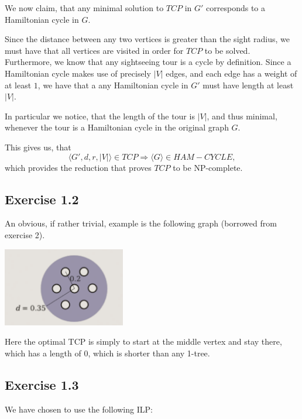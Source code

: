 \documentclass[11pt,a4paper]{article}
\begin{document}
We now claim, that any minimal solution to $TCP$ in $G'$ corresponds to
a Hamiltonian cycle in $G$.

Since the distance between any two vertices is greater than the sight radius,
we must have that all vertices are visited in order for $TCP$ to be solved.
Furthermore, we know that any sightseeing tour is a cycle by definition. Since a
Hamiltonian cycle makes use of precisely $|V|$ edges, and each edge has a weight of
at least $1$, we have that a any Hamiltonian cycle in $G'$ must have length at least $|V|$.

In particular we notice, that the length of the tour is $|V|$, and thus minimal,
whenever the tour is a Hamiltonian cycle in the original graph $G$.

This gives us, that
\[
    \langle G', d, r, |V| \rangle \in TCP \Rightarrow \langle G \rangle \in HAM-CYCLE,
\]
which provides the reduction that proves $TCP$ to be NP-complete.

\subsection{Exercise 1.2}
An obvious, if rather trivial, example is the following graph (borrowed from exercise 2).

\centerline{\includegraphics[width=0.4\textwidth]{tcp.png}}

Here the optimal TCP is simply to start at the middle vertex and stay there, which has a length of 0, which is shorter than any 1-tree.

\subsection{Exercise 1.3}
We have chosen to use the following ILP:
\end{document}

